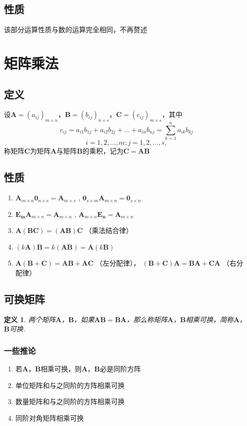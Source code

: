 \documentclass[12pt,oneside]{ctexbook}
\newtheorem{definition}[subsection]{定义}
\begin{document}
\subsection{性质} 该部分运算性质与数的运算完全相同，不再赘述
\section{矩阵乘法}
\subsection{定义}
设\(\mathbf{A}=(a_{ij})_{m\times n}\)，\(\mathbf{B}=(b_{ij})_{n\times s}\)，\(\mathbf{C}=(c_{ij})_{m\times s}\)，其中
\[c_{ij}=a_{i1}b_{1j}+a_{i2}b_{2j}+\dots +a_{in}b_{nj}=\sum_{k=1}^n a_{ik}b_{kj}\]
\[i=1,2,\dots ,m;j=1,2,\dots,s,\]
称矩阵\(\mathbf{C}\)为矩阵\(\mathbf{A}\)与矩阵\(\mathbf{B}\)的乘积，记为\(\mathbf{C}=\mathbf{A}\mathbf{B}\)
\subsection{性质}
\begin{enumerate}
    \item \(\mathbf{A}_{m\times n}\mathbf{0}_{n\times s}=\mathbf{A}_{m\times s}\)  ,  \(\mathbf{0}_{s\times m}\mathbf{A}_{m\times n}=\mathbf{0}_{s\times n}\)
    \item \(\mathbf{E_m}\mathbf{A}_{m\times n}=\mathbf{A}_{m\times n}\)     ,     \(\mathbf{A}_{m\times n}\mathbf{E_n}=\mathbf{A}_{m\times n}\)
    \item \(\mathbf{A}(\mathbf{B}\mathbf{C})=(\mathbf{A}\mathbf{B})\mathbf{C}\) （乘法结合律）
    \item \((k\mathbf{A})\mathbf{B}=k(\mathbf{A}\mathbf{B})=\mathbf{A}(k\mathbf{B})\)
    \item \(\mathbf{A}(\mathbf{B}+\mathbf{C})=\mathbf{A}\mathbf{B}+\mathbf{A}\mathbf{C}\) （左分配律）， \((\mathbf{B}+\mathbf{C})\mathbf{A}=\mathbf{B}\mathbf{A}+\mathbf{C}\mathbf{A}\) （右分配律）
\end{enumerate}

\subsection{可换矩阵}
\begin{definition}
两个矩阵\(\mathbf{A}\)，\(\mathbf{B}\)，如果\(\mathbf{AB}=\mathbf{BA}\)，那么称矩阵\(\mathbf{A}\)，\(\mathbf{B}\)相乘可换，简称\(\mathbf{A}\)，\(\mathbf{B}\)可换.
\end{definition}
\subsubsection{一些推论}
\begin{enumerate}
    \item 若\(\mathbf{A}\)，\(\mathbf{B}\)相乘可换，则\(\mathbf{A}\)，\(\mathbf{B}\)必是同阶方阵
    \item 单位矩阵和与之同阶的方阵相乘可换
    \item 数量矩阵和与之同阶的方阵相乘可换
    \item 同阶对角矩阵相乘可换
\end{enumerate}
\end{document}
